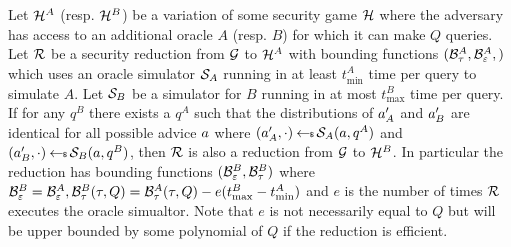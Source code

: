 \begin{lemma}
  \label{oracle-sub}
  Let $\mathcal{H}^A$ (resp. $\mathcal{H}^B$) be a variation of some security game $\mathcal{H}$ where the adversary has access to an additional oracle $A$ (resp. $B$) for which it can make $Q$ queries.
  Let $\mathcal{R}$ be a security reduction from $\mathcal{G}$ to $\mathcal{H}^A$ with bounding functions $(\mathcal{B}^A_\tau, \mathcal{B}^A_\varepsilon, )$ which uses an oracle simulator $\mathcal{S}_A$ running in at least $t^A_{\min}$ time per query to simulate $A$.
  Let $\mathcal{S}_B$ be a simulator for $B$ running in at most $t^B_{\max}$ time per query.
  If for any $q^B$ there exists a $q^A$ such that the distributions of $a'_A$ and $a'_B$ are identical for all possible advice $a$ where $(a'_A, \cdot) \hskip2.3pt{\gets\!\!\mbox{\tiny${\$}$\normalsize}}\, \mathcal{S}_A(a, q^A)$ and $(a'_B, \cdot) \hskip2.3pt{\gets\!\!\mbox{\tiny${\$}$\normalsize}}\, \mathcal{S}_B(a, q^B)$,
  then $\mathcal{R}$ is also a reduction from $\mathcal{G}$ to $\mathcal{H}^B$.
  In particular the reduction has bounding functions $(\mathcal{B}^B_\varepsilon, \mathcal{B}^B_\tau)$ where $\mathcal{B}^B_\varepsilon = \mathcal{B}^A_\varepsilon,\mathcal{B}^B_\tau(\tau, Q) = \mathcal{B}^A_\tau(\tau, Q) - e(t^B_{\max} - t^A_{\min})$ and $e$ is the number of times $\mathcal{R}$ executes the oracle simualtor.
  Note that $e$ is not necessarily equal to $Q$ but will be upper bounded by some polynomial of $Q$ if the reduction is efficient.
\end{lemma}

